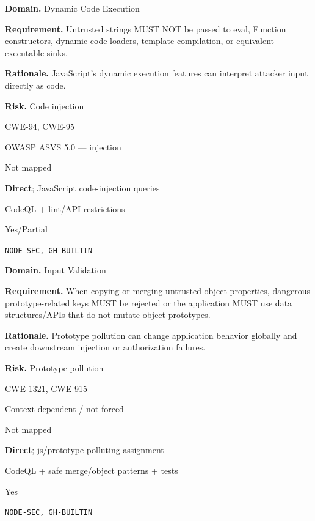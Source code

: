 \documentclass[10pt,letterpaper]{article}
\newcommand{\prioritybadge}[2]{\tcbox[on line,boxrule=0pt,arc=1.2mm,boxsep=0.7mm,left=1mm,right=1mm,top=0.4mm,bottom=0.4mm,colback=#2!12,coltext=#2]{\scriptsize\bfseries #1}}
\begin{document}
\begin{rulebox}[title={\texttt{SCS-JS-DYN-001} \hfill \prioritybadge{Critical Control}{Critical}}]
\textbf{Domain.} Dynamic Code Execution

\textbf{Requirement.} Untrusted strings MUST NOT be passed to eval, Function constructors, dynamic code loaders, template compilation, or equivalent executable sinks.

\textbf{Rationale.} JavaScript's dynamic execution features can interpret attacker input directly as code.

\textbf{Risk.} Code injection

\begin{description}[leftmargin=2.65cm,labelwidth=2.3cm,style=nextline,itemsep=1pt,topsep=3pt]
  \item[CWE] CWE-94, CWE-95
  \item[OWASP] OWASP ASVS 5.0 --- injection
  \item[CERT] Not mapped
  \item[CodeQL] \textbf{Direct}; JavaScript code-injection queries
  \item[Enforcement] CodeQL + lint/API restrictions
  \item[Automation] Yes/Partial
  \item[Sources] \texttt{NODE-SEC, GH-BUILTIN}
\end{description}
\end{rulebox}

\begin{rulebox}[title={\texttt{SCS-JS-INPUT-001} \hfill \prioritybadge{High Priority}{High}}]
\textbf{Domain.} Input Validation

\textbf{Requirement.} When copying or merging untrusted object properties, dangerous prototype-related keys MUST be rejected or the application MUST use data structures/APIs that do not mutate object prototypes.

\textbf{Rationale.} Prototype pollution can change application behavior globally and create downstream injection or authorization failures.

\textbf{Risk.} Prototype pollution

\begin{description}[leftmargin=2.65cm,labelwidth=2.3cm,style=nextline,itemsep=1pt,topsep=3pt]
  \item[CWE] CWE-1321, CWE-915
  \item[OWASP] Context-dependent / not forced
  \item[CERT] Not mapped
  \item[CodeQL] \textbf{Direct}; js/prototype-polluting-assignment
  \item[Enforcement] CodeQL + safe merge/object patterns + tests
  \item[Automation] Yes
  \item[Sources] \texttt{NODE-SEC, GH-BUILTIN}
\end{description}
\end{rulebox}
\end{document}
